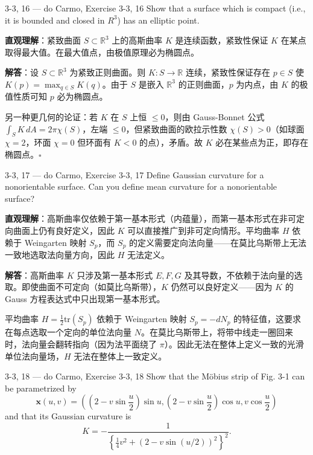 \begin{exercise}{3-3, 16 — do Carmo, Exercise 3-3, 16}
Show that a surface which is compact (i.e., it is bounded and closed in $R^3$) has an elliptic point.
\end{exercise}

\begin{solution}
\textbf{直观理解}：紧致曲面 $S\subset\mathbb{R}^3$ 上的高斯曲率 $K$ 是连续函数，紧致性保证 $K$ 在某点取得最大值。在最大值点，由极值原理必为椭圆点。

\textbf{解答}：设 $S\subset\mathbb{R}^3$ 为紧致正则曲面。则 $K\colon S\to\mathbb{R}$ 连续，紧致性保证存在 $p\in S$ 使 $K(p)=\max_{q\in S}K(q)$。由于 $S$ 是嵌入 $\mathbb{R}^3$ 的正则曲面，$p$ 为内点，由 $K$ 的极值性质可知 $p$ 必为椭圆点。

另一种更几何的论证：若 $K$ 在 $S$ 上恒 $\leq 0$，则由 Gauss-Bonnet 公式 $\int_S K\,dA=2\pi\chi(S)$，左端 $\leq 0$，但紧致曲面的欧拉示性数 $\chi(S)>0$（如球面 $\chi=2$，环面 $\chi=0$ 但环面有 $K<0$ 的点），矛盾。故 $K$ 必在某些点为正，即存在椭圆点。$\square$
\end{solution}

\begin{exercise}{3-3, 17 — do Carmo, Exercise 3-3, 17}
Define Gaussian curvature for a nonorientable surface. Can you define mean curvature for a nonorientable surface?
\end{exercise}

\begin{solution}
\textbf{直观理解}：高斯曲率仅依赖于第一基本形式（内蕴量），而第一基本形式在非可定向曲面上仍有良好定义，因此 $K$ 可以直接推广到非可定向情形。平均曲率 $H$ 依赖于 Weingarten 映射 $S_p$，而 $S_p$ 的定义需要定向法向量——在莫比乌斯带上无法一致地选取法向量方向，因此 $H$ 无法定义。

\textbf{解答}：高斯曲率 $K$ 只涉及第一基本形式 $E, F, G$ 及其导数，不依赖于法向量的选取。即使曲面不可定向（如莫比乌斯带），$K$ 仍然可以良好定义——因为 $K$ 的 Gauss 方程表达式中只出现第一基本形式。

平均曲率 $H = \frac{1}{2}\mathrm{tr}(S_p)$ 依赖于 Weingarten 映射 $S_p = -dN_p$ 的特征值，这要求在每点选取一个定向的单位法向量 $N$。在莫比乌斯带上，将带中线走一圈回来时，法向量会翻转指向（因为法平面绕了 $\pi$）。因此无法在整体上定义一致的光滑单位法向量场，$H$ 无法在整体上一致定义。
\end{solution}

\begin{exercise}{3-3, 18 — do Carmo, Exercise 3-3, 18}
Show that the Möbius strip of Fig. 3-1 can be parametrized by
\[
\mathbf{x} (u, v) = \left(\left(2 - v \sin \frac {u}{2}\right) \sin u, \left(2 - v \sin \frac {u}{2}\right) \cos u, v \cos \frac {u}{2}\right)
\]
and that its Gaussian curvature is
\[
K = - \frac {1}{\left\{\frac {1}{4} v ^ {2} + (2 - v \sin (u / 2)) ^ {2} \right\} ^ {2}}.
\]
\end{exercise}

